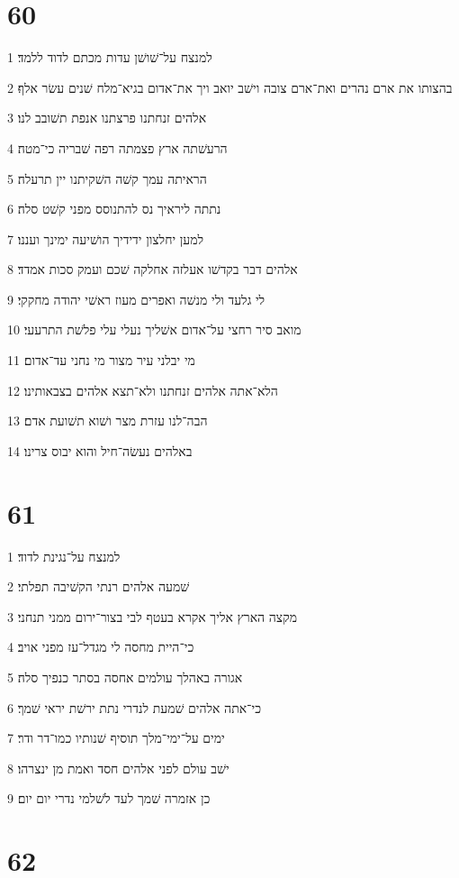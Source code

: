 \chapter{60}

\par 1 למנצח על־שׁושׁן עדות מכתם לדוד ללמד׃
\par 2 בהצותו את ארם נהרים ואת־ארם צובה וישׁב יואב ויך את־אדום בגיא־מלח שׁנים עשׂר אלף׃
\par 3 אלהים זנחתנו פרצתנו אנפת תשׁובב לנו׃
\par 4 הרעשׁתה ארץ פצמתה רפה שׁבריה כי־מטה׃
\par 5 הראיתה עמך קשׁה השׁקיתנו יין תרעלה׃
\par 6 נתתה ליראיך נס להתנוסס מפני קשׁט סלה׃
\par 7 למען יחלצון ידידיך הושׁיעה ימינך ועננו׃
\par 8 אלהים דבר בקדשׁו אעלזה אחלקה שׁכם ועמק סכות אמדד׃
\par 9 לי גלעד ולי מנשׁה ואפרים מעוז ראשׁי יהודה מחקקי׃
\par 10 מואב סיר רחצי על־אדום אשׁליך נעלי עלי פלשׁת התרעעי׃
\par 11 מי יבלני עיר מצור מי נחני עד־אדום׃
\par 12 הלא־אתה אלהים זנחתנו ולא־תצא אלהים בצבאותינו׃
\par 13 הבה־לנו עזרת מצר ושׁוא תשׁועת אדם׃
\par 14 באלהים נעשׂה־חיל והוא יבוס צרינו׃

\chapter{61}

\par 1 למנצח על־נגינת לדוד׃
\par 2 שׁמעה אלהים רנתי הקשׁיבה תפלתי׃
\par 3 מקצה הארץ אליך אקרא בעטף לבי בצור־ירום ממני תנחני׃
\par 4 כי־היית מחסה לי מגדל־עז מפני אויב׃
\par 5 אגורה באהלך עולמים אחסה בסתר כנפיך סלה׃
\par 6 כי־אתה אלהים שׁמעת לנדרי נתת ירשׁת יראי שׁמך׃
\par 7 ימים על־ימי־מלך תוסיף שׁנותיו כמו־דר ודר׃
\par 8 ישׁב עולם לפני אלהים חסד ואמת מן ינצרהו׃
\par 9 כן אזמרה שׁמך לעד לשׁלמי נדרי יום יום׃

\chapter{62}

